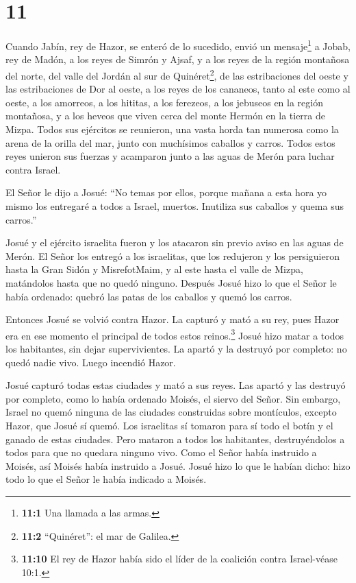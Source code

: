 \hypertarget{section-10}{%
\section{11}\label{section-10}}

 Cuando Jabín, rey de Hazor, se enteró de lo sucedido, envió
un mensaje\footnote{\textbf{11:1} Una llamada a las armas.} a Jobab, rey
de Madón, a los reyes de Simrón y Ajsaf,  y a los reyes de
la región montañosa del norte, del valle del Jordán al sur de
Quinéret\footnote{\textbf{11:2} ``Quinéret'': el mar de Galilea.}, de
las estribaciones del oeste y las estribaciones de Dor al oeste,
 a los reyes de los cananeos, tanto al este como al oeste, a
los amorreos, a los hititas, a los ferezeos, a los jebuseos en la región
montañosa, y a los heveos que viven cerca del monte Hermón en la tierra
de Mizpa.  Todos sus ejércitos se reunieron, una vasta horda
tan numerosa como la arena de la orilla del mar, junto con muchísimos
caballos y carros.  Todos estos reyes unieron sus fuerzas y
acamparon junto a las aguas de Merón para luchar contra Israel.

 El Señor le dijo a Josué: ``No temas por ellos, porque
mañana a esta hora yo mismo los entregaré a todos a Israel, muertos.
Inutiliza sus caballos y quema sus carros.''

 Josué y el ejército israelita fueron y los atacaron sin
previo aviso en las aguas de Merón.  El Señor los entregó a
los israelitas, que los redujeron y los persiguieron hasta la Gran Sidón
y MisrefotMaim, y al este hasta el valle de Mizpa, matándolos hasta que
no quedó ninguno.  Después Josué hizo lo que el Señor le
había ordenado: quebró las patas de los caballos y quemó los carros.

 Entonces Josué se volvió contra Hazor. La capturó y mató a
su rey, pues Hazor era en ese momento el principal de todos estos
reinos.\footnote{\textbf{11:10} El rey de Hazor había sido el líder de
  la coalición contra Israel-véase 10:1.}  Josué hizo matar
a todos los habitantes, sin dejar supervivientes. La apartó y la
destruyó por completo: no quedó nadie vivo. Luego incendió Hazor.

 Josué capturó todas estas ciudades y mató a sus reyes. Las
apartó y las destruyó por completo, como lo había ordenado Moisés, el
siervo del Señor.  Sin embargo, Israel no quemó ninguna de
las ciudades construidas sobre montículos, excepto Hazor, que Josué sí
quemó.  Los israelitas sí tomaron para sí todo el botín y
el ganado de estas ciudades. Pero mataron a todos los habitantes,
destruyéndolos a todos para que no quedara ninguno vivo. 
Como el Señor había instruido a Moisés, así Moisés había instruido a
Josué. Josué hizo lo que le habían dicho: hizo todo lo que el Señor le
había indicado a Moisés.

